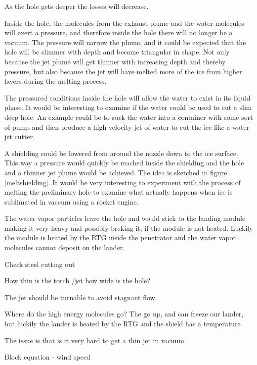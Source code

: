 As the hole gets deeper the losses will decrease. 

Inside the hole, the molecules from the exhaust plume and the water molecules will exert a pressure, and therefore inside the hole there will no longer be a vacuum. The pressure will narrow the plume, and it could be expected that the hole will be slimmer with depth and become triangular in shape. Not only because the jet plume will get thinner with increasing depth and thereby pressure, but also because the jet will have melted more of the ice from higher layers during the melting process. 

The pressured conditions inside the hole will allow the water to exist in its liquid phase. It would be interesting to examine if the water could be used to cut a slim deep hole. An example could be to suck the water into a container with some sort of pump and then produce a high velocity jet of water to cut the ice like a water jet cutter. 

A shielding could be lowered from around the nozzle down to the ice surface. This way a pressure would quickly be reached inside the shielding and the hole and a thinner jet plume would be achieved. The idea is sketched in figure \ref{meltshielding}.
It would be very interesting to experiment with the process of melting the preliminary hole to examine what actually happens when ice is sublimated in vaccum using a rocket engine. 


The water vapor particles leave the hole and would stick to the landing module making it very heavy and possibly breking it, if the module is not heated. Luckily the module is heated by the RTG inside the penetrator and the water vapor molecules cannot deposit on the lander. 

Check steel cutting out

How thin is the torch /jet how wide is the hole?


The jet should be turnable to avoid stagnant flow. 

Where do the high energy molecules go? The go up, and can freeze our lander, but luckily the lander is heated by the RTG and the shield has a temperature 

The issue is that is it very hard to get a thin jet in vacuum. 

Block equation - wind speed